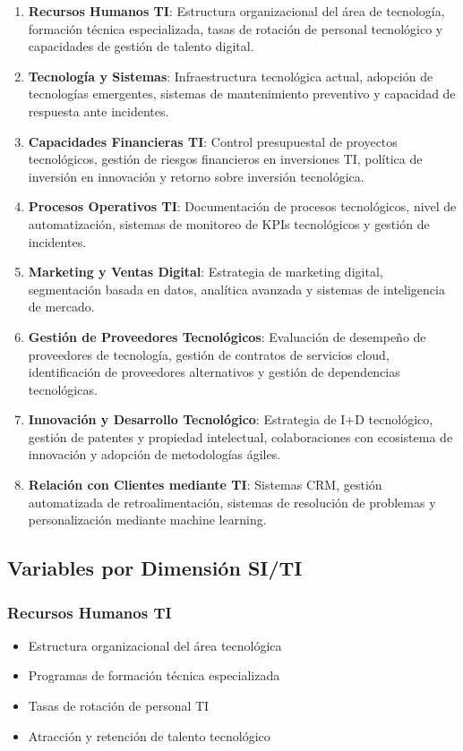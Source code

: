 \begin{enumerate}
\item \textbf{Recursos Humanos TI}: Estructura organizacional del área de tecnología, formación técnica especializada, tasas de rotación de personal tecnológico y capacidades de gestión de talento digital.

\item \textbf{Tecnología y Sistemas}: Infraestructura tecnológica actual, adopción de tecnologías emergentes, sistemas de mantenimiento preventivo y capacidad de respuesta ante incidentes.

\item \textbf{Capacidades Financieras TI}: Control presupuestal de proyectos tecnológicos, gestión de riesgos financieros en inversiones TI, política de inversión en innovación y retorno sobre inversión tecnológica.

\item \textbf{Procesos Operativos TI}: Documentación de procesos tecnológicos, nivel de automatización, sistemas de monitoreo de KPIs tecnológicos y gestión de incidentes.

\item \textbf{Marketing y Ventas Digital}: Estrategia de marketing digital, segmentación basada en datos, analítica avanzada y sistemas de inteligencia de mercado.

\item \textbf{Gestión de Proveedores Tecnológicos}: Evaluación de desempeño de proveedores de tecnología, gestión de contratos de servicios cloud, identificación de proveedores alternativos y gestión de dependencias tecnológicas.

\item \textbf{Innovación y Desarrollo Tecnológico}: Estrategia de I+D tecnológico, gestión de patentes y propiedad intelectual, colaboraciones con ecosistema de innovación y adopción de metodologías ágiles.

\item \textbf{Relación con Clientes mediante TI}: Sistemas CRM, gestión automatizada de retroalimentación, sistemas de resolución de problemas y personalización mediante machine learning.
\end{enumerate}

\subsection{Variables por Dimensión SI/TI}

\subsubsection{Recursos Humanos TI}
\begin{itemize}
\item Estructura organizacional del área tecnológica
\item Programas de formación técnica especializada
\item Tasas de rotación de personal TI
\item Atracción y retención de talento tecnológico
\end{itemize}


